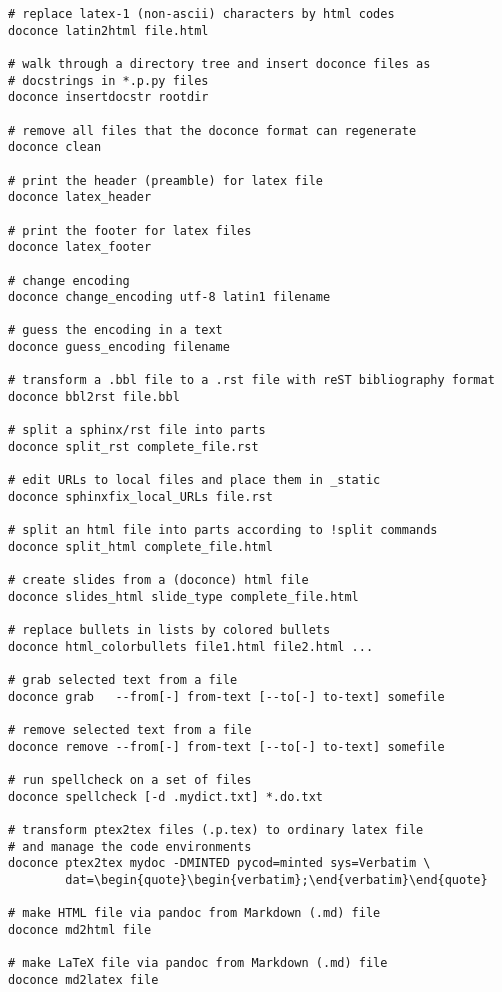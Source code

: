\documentclass[%
oneside,                 %
final,                   %
10pt]{article}
\begin{document}
\begin{Verbatim}[numbers=none,fontsize=\fontsize{9pt}{9pt},baselinestretch=0.85,xleftmargin=0mm]
# replace latex-1 (non-ascii) characters by html codes
doconce latin2html file.html

# walk through a directory tree and insert doconce files as
# docstrings in *.p.py files
doconce insertdocstr rootdir

# remove all files that the doconce format can regenerate
doconce clean

# print the header (preamble) for latex file
doconce latex_header

# print the footer for latex files
doconce latex_footer

# change encoding
doconce change_encoding utf-8 latin1 filename

# guess the encoding in a text
doconce guess_encoding filename

# transform a .bbl file to a .rst file with reST bibliography format
doconce bbl2rst file.bbl

# split a sphinx/rst file into parts
doconce split_rst complete_file.rst

# edit URLs to local files and place them in _static
doconce sphinxfix_local_URLs file.rst

# split an html file into parts according to !split commands
doconce split_html complete_file.html

# create slides from a (doconce) html file
doconce slides_html slide_type complete_file.html

# replace bullets in lists by colored bullets
doconce html_colorbullets file1.html file2.html ...

# grab selected text from a file
doconce grab   --from[-] from-text [--to[-] to-text] somefile

# remove selected text from a file
doconce remove --from[-] from-text [--to[-] to-text] somefile

# run spellcheck on a set of files
doconce spellcheck [-d .mydict.txt] *.do.txt

# transform ptex2tex files (.p.tex) to ordinary latex file
# and manage the code environments
doconce ptex2tex mydoc -DMINTED pycod=minted sys=Verbatim \
        dat=\begin{quote}\begin{verbatim};\end{verbatim}\end{quote}

# make HTML file via pandoc from Markdown (.md) file
doconce md2html file

# make LaTeX file via pandoc from Markdown (.md) file
doconce md2latex file


\end{Verbatim}
\end{document}
